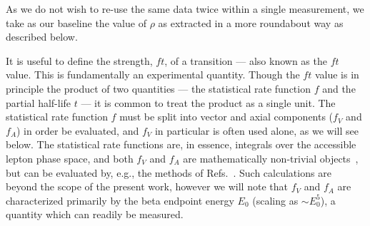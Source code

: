 As we do not wish to re-use the same data twice within a single measurement, we take as our baseline the value of $\rho$ as extracted in a more roundabout way as described below.


It is useful to define the strength, $ft$, of a transition --- also known as the $ft$ value.  This is fundamentally an experimental quantity.  Though the $ft$ value is in principle the product of two quantities --- the statistical rate function $f$ and the partial half-life $t$ --- it is common to treat the product as a single unit.  
%
The statistical rate function $f$ must be split into vector and axial components ($f_V$ and $f_A$) in order be evaluated, and $f_V$ in particular is often used alone, as we will see below.  The statistical rate functions are, in essence, integrals over the accessible lepton phase space, and both $f_V$ and $f_A$ are mathematically non-trivial objects~\cite{towner_hardy_1995_frombook,HardyTowner2005_Superallowed}, but can be evaluated by, e.g., the methods of Refs.~\cite{wilkinson2,wilkinson3,wilkinson4}.  
Such calculations are beyond the scope of the present work, however we will note that 
$f_V$ and $f_A$ are characterized primarily by the beta endpoint energy $E_0$ (scaling as $\sim E_0^5$), a quantity which can readily be measured.  


